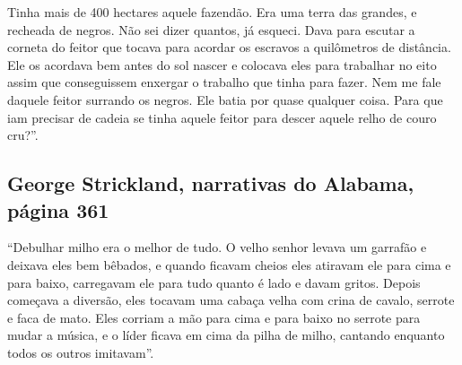 Tinha mais de 400 hectares aquele fazendão. Era uma terra das grandes, e
recheada de negros. Não sei dizer quantos, já esqueci. Dava para escutar
a corneta do feitor que tocava para acordar os escravos a quilômetros de
distância. Ele os acordava bem antes do sol nascer e colocava eles para
trabalhar no eito assim que conseguissem enxergar o trabalho que tinha
para fazer. Nem me fale daquele feitor surrando os negros. Ele batia por
quase qualquer coisa. Para que iam precisar de cadeia se tinha aquele
feitor para descer aquele relho de couro cru?''.

\subsection{George Strickland, narrativas do Alabama, página 361}
\label{ref256} 

``Debulhar milho era o melhor de tudo. O velho senhor levava um garrafão
e deixava eles bem bêbados, e quando ficavam cheios eles atiravam ele
para cima e para baixo, carregavam ele para tudo quanto é lado e davam
gritos. Depois começava a diversão, eles tocavam uma cabaça velha com
crina de cavalo, serrote e faca de mato. Eles corriam a mão para cima e
para baixo no serrote para mudar a música, e o líder ficava em cima da
pilha de milho, cantando enquanto todos os outros imitavam''.

\pagebreak
\thispagestyle{empty}

